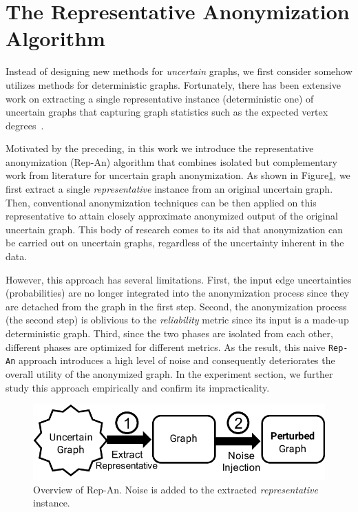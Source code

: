 \section{The Representative Anonymization Algorithm}
\label{sec:repOB}
Instead of designing new methods for \emph{uncertain} graphs, we first consider somehow utilizes methods for deterministic graphs. Fortunately, there has been extensive work on extracting a single representative instance (deterministic one) of uncertain graphs that capturing graph statistics such as the expected vertex degrees~\cite{Parchas_Gullo_Papadias_Bonchi_2014}.  

Motivated by the preceding, in this work we introduce the representative anonymization (Rep-An) algorithm that combines isolated but complementary work from literature for uncertain graph anonymization. As shown in Figure\ref{fig:repOB}, we first extract a single \emph{representative} instance from an original uncertain graph. Then, conventional anonymization techniques can be then applied on this representative to attain closely approximate anonymized output of the original uncertain graph. This body of research comes to its aid that anonymization can be carried out on uncertain graphs, regardless of the uncertainty inherent in the data.


However, this approach has several limitations. First, the input edge uncertainties (probabilities) are no longer integrated into the anonymization process since they are detached from the graph in the first step. Second, the anonymization process (the second step) is oblivious to the {\em reliability} metric since its input is a made-up deterministic graph. Third, since the two phases are isolated from each other, different phases are optimized for different metrics. As the result, this naive \texttt{Rep-An} approach introduces a high level of noise and consequently deteriorates the overall utility of the anonymized graph. 
In the experiment section, we further study this approach empirically and confirm its impracticality.

\begin{figure}[t]
	\vspace{-1em}
    \captionsetup{margin=0cm}
    \centering  
        \includegraphics[width=0.95\columnwidth]{AddFigure/repOB.pdf}
        \vspace{-0.7em}
    	\caption{Overview of Rep-An. Noise is added to the extracted \emph{representative} instance.}
    \label{fig:repOB}
    \vspace{-0.5em}
\end{figure}
